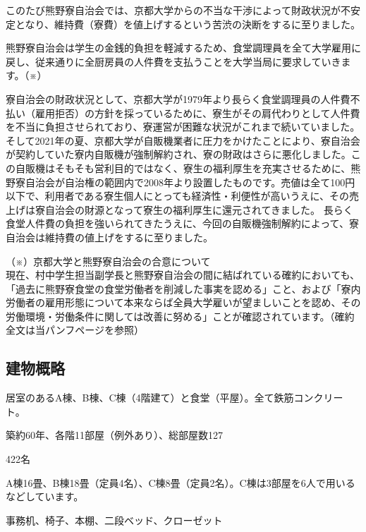     \begin{tcolorbox}[colback=white, colbacktitle=gray!30!white, coltitle=black, title=2022年4月からの寮費200円値上げについて,breakable]
      \setlength{\parindent}{1zw}
      \small{このたび熊野寮自治会では、京都大学からの不当な干渉によって財政状況が不安定となり、維持費（寮費）を値上げするという苦渋の決断をするに至りました。
      
      熊野寮自治会は学生の金銭的負担を軽減するため、食堂調理員を全て大学雇用に戻し、従来通りに全厨房員の人件費を支払うことを大学当局に要求していきます。（※）
      
      寮自治会の財政状況として、京都大学が1979年より長らく食堂調理員の人件費不払い（雇用拒否）の方針を採っているために、寮生がその肩代わりとして人件費を不当に負担させられており、寮運営が困難な状況がこれまで続いていました。そして2021年の夏、京都大学が自販機業者に圧力をかけたことにより、寮自治会が契約していた寮内自販機が強制解約され、寮の財政はさらに悪化しました。この自販機はそもそも営利目的ではなく、寮生の福利厚生を充実させるために、熊野寮自治会が自治権の範囲内で2008年より設置したものです。売値は全て100円以下で、利用者である寮生個人にとっても経済性・利便性が高いうえに、その売上げは寮自治会の財源となって寮生の福利厚生に還元されてきました。
      長らく食堂人件費の負担を強いられてきたうえに、今回の自販機強制解約によって、寮自治会は維持費の値上げをするに至りました。
      
      \noindent（※）京都大学と熊野寮自治会の合意について\\

      現在、村中学生担当副学長と熊野寮自治会の間に結ばれている確約においても、「過去に熊野寮食堂の食堂労働者を削減した事実を認める」こと、および「寮内労働者の雇用形態について本来ならば全員大学雇いが望ましいことを認め、その労働環境・労働条件に関しては改善に努める」ことが確認されています。（確約全文は当パンフ\pageref{page:確約}ページを参照）}

    \end{tcolorbox}


		\subsection{建物概略}
		\begin{description}
		\item 居室のあるA棟、B棟、C棟（4階建て）と食堂（平屋）。全て鉄筋コンクリート。
		\item 築約60年、各階11部屋（例外あり）、総部屋数127
		\item[定員] 422名
		\item[居室] A棟16畳、B棟18畳（定員4名）、C棟8畳（定員2名）。C棟は3部屋を6人で用いるなどしています。
		\item[備品] 事務机、椅子、本棚、二段ベッド、クローゼット
		\end{description}


